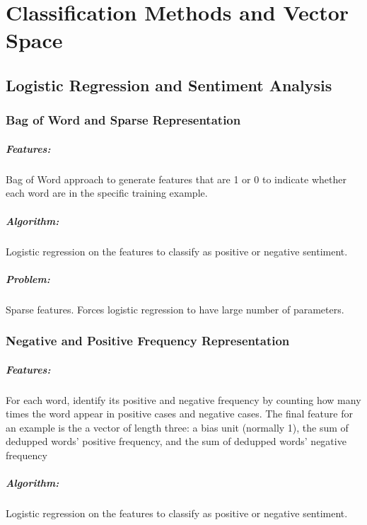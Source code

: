 \chapter{Classification Methods and Vector Space}

\section{Logistic Regression and Sentiment Analysis}

\subsection{Bag of Word and Sparse Representation} 

\paragraph{Features:} 
Bag of Word approach to generate features that are 1 or 0 to indicate whether each word are in the specific training example. 

\paragraph{Algorithm:} 
Logistic regression on the features to classify as positive or negative sentiment. 

\paragraph{Problem:} 
Sparse features. Forces logistic regression to have large number of parameters. 


\subsection{Negative and Positive Frequency Representation} 
\paragraph{Features:} 
For each word, identify its positive and negative frequency by counting how many times the word appear in positive cases and negative cases. The final feature for an example is the a vector of length three: a bias unit (normally 1), the sum of dedupped words' positive frequency, and the sum of dedupped words' negative frequency 

\paragraph{Algorithm:} 
Logistic regression on the features to classify as positive or negative sentiment. 





